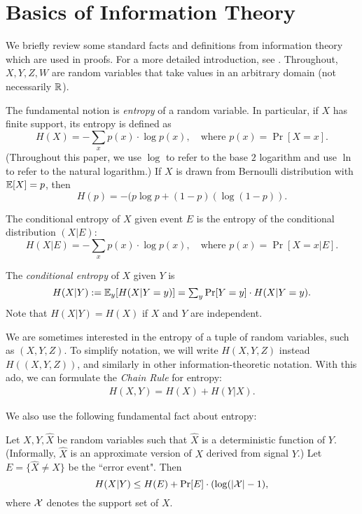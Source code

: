 \section{Basics of Information Theory}
\label{app:info-theory}

We briefly review some standard facts and definitions from information theory which are used in proofs. For a more detailed introduction, see \cite{CK11}. Throughout, $X,Y,Z,W$ are random variables that take values in an arbitrary domain (not necessarily $\mathbb{R}$).

The fundamental notion is \emph{entropy} of a random variable. In particular, if $X$ has finite support, its entropy is defined as
\[ H(X) = \textstyle - \sum_{x} p(x)\cdot  \log p(x),
\quad\text{where } p(x) = \Pr[X = x]. \]
(Throughout this paper, we use $\log$ to refer to the base $2$ logarithm and use $\ln$ to refer to the natural logarithm.) If $X$ is drawn from Bernoulli distribution with $\mathbb{E}[X]=p$, then
    \[ H(p) = -(p\log p + (1-p)(\log(1-p)). \]

The conditional entropy of $X$ given event $E$ is the entropy of the conditional distribution $(X|E)$:
\[ H(X|E) = \textstyle - \sum_{x} p(x)\cdot  \log p(x),
\quad\text{where } p(x) = \Pr[X = x | E]. \]

The \emph{conditional entropy} of $X$ given $Y$ is
\[ H(X|Y)
    := \mathbb{E}_y[H(X|Y = y)]
    = \textstyle \sum_{y} \Pr[Y=y]\cdot H(X|Y = y). \]
Note that $H(X|Y) = H(X)$ if $X$ and $Y$ are independent.

We are sometimes interested in the entropy of a tuple of random variables, such as $(X,Y,Z)$. To simplify notation, we will write $H(X,Y,Z)$ instead $H((X,Y,Z))$, and similarly in other information-theoretic notation. With this ado, we can formulate the \emph{Chain Rule} for entropy:
\begin{align}\label{app:info-entropy-chain-rule}
 H(X,Y) = H(X) + H(Y|X). 
\end{align}


We also use the following fundamental fact about entropy:

\begin{lemma}
Let $X,Y,\hat{X}$ be random variables such that $\hat{X}$ is a deterministic function of $Y$. (Informally, $\hat{X}$ is an approximate version of $X$ derived from signal $Y$.) Let $E = \{ \hat{X} \neq X \}$ be the ``error event". Then
    \[ H(X|Y) \leq H(E) + \Pr[E] \cdot (\log(|\mathcal{X}|-1), \]
where $\mathcal{X}$ denotes the support set of $X$.
\end{lemma} 

